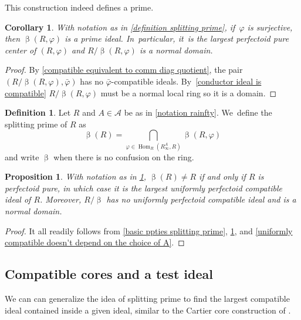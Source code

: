 \documentclass[11pt]{article}
\let\autoref\cref
\theoremstyle{plain}
\newtheorem{corollary}[theorem]{Corollary}
\newtheorem{proposition}[theorem]{Proposition}
\theoremstyle{definition}
\newtheorem{definition}[theorem]{Definition}
\numberwithin{equation}{theorem}
\DeclareMathOperator{\Hom}{Hom}
\newcommand{\sA}{\mathcal{A}}
\renewcommand{\phi}{\varphi}
\newcommand{\rphi}{(R,\phi)}
\newcommand{\rafty}{R^A_\infty}
\begin{document}
This construction indeed defines a prime.

\begin{corollary}\label{splitting prime is prime}
With notation as in \autoref{definition splitting prime}, if~$\phi$ is surjective, then $\upbeta\rphi$ is a prime ideal. In~particular, it~is the largest perfectoid pure center of $\rphi$ and $R/\upbeta\rphi$ is a normal domain.
\end{corollary}

\begin{proof}
By \autoref{compatible equivalent to comm diag quotient}, the pair $(R/\upbeta\rphi, \bar{\phi})$ has no $\bar{\phi}$-compatible ideals. By~\autoref{conductor ideal is compatible} $R/\upbeta\rphi$ must be a normal local ring so it is a domain.
\end{proof}

\begin{definition}\label{definition uniform splitting prime}
Let $R$ and $A\in\sA$ be as in \autoref{notation rainfty}. We~define the splitting prime of $R$ as
\[
\upbeta(R)=\bigcap_{\phi\in \Hom_R\left(\rafty,R\right)}\upbeta\rphi
\]
and write $\upbeta$ when there is no confusion on the ring.
\end{definition}

\begin{proposition}\label{basic properties uniform splitting prime}
With notation as in \autoref{definition uniform splitting prime}, $\upbeta(R)\neq R$ if and only if $R$ is perfectoid pure, in which case it is the largest uniformly perfectoid compatible ideal of $R$. Moreover, $R/\upbeta$ has no uniformly perfectoid compatible ideal and is a normal domain.
\end{proposition}

\begin{proof}
It all readily follows from \autoref{basic ppties splitting prime}, \autoref{splitting prime is prime}, and \autoref{uniformly compatible doesn't depend on the choice of A}.
\end{proof}

\subsection{Compatible cores and a test ideal}\label{section compatible cores}
We can can generalize the idea of splitting prime to find the largest compatible ideal contained inside a given ideal, similar to the Cartier core construction of \cite{BadillaCespedesFInvariantsSRRings,BrosowskyCartierCoreMap,CarvajalFayolleTameRamificationCFPS}.
\end{document}
